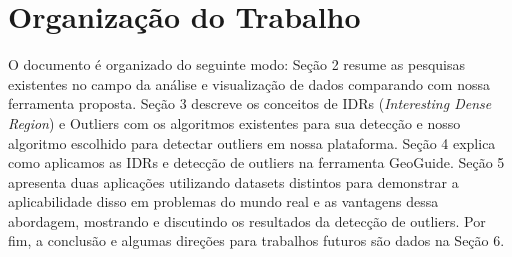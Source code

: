 \section{Organização do Trabalho}

O documento é organizado do seguinte modo: Seção 2 resume as pesquisas existentes no campo da análise e visualização de dados comparando com nossa ferramenta proposta. Seção 3 descreve os conceitos de IDRs (\textit{Interesting Dense Region}) e Outliers com os algoritmos existentes para sua detecção e nosso algoritmo escolhido para detectar outliers em nossa plataforma. Seção 4 explica como aplicamos as IDRs e detecção de outliers na ferramenta GeoGuide. Seção 5 apresenta duas aplicações utilizando datasets distintos para demonstrar a aplicabilidade disso em problemas do mundo real e as vantagens dessa abordagem, mostrando e discutindo os resultados da detecção de outliers. Por fim, a conclusão e algumas direções para trabalhos futuros são dados na Seção 6.